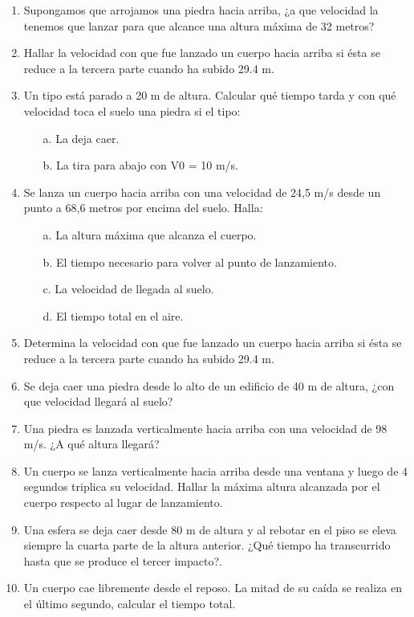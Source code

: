 \documentclass[a5paper,pagesize,10pt,bibtotoc,pointlessnumbers,
normalheadings,DIV=9,fleqn,x11names,table,twoside=false]{scrbook}
\begin{document}
\begin{enumerate}
 \item Supongamos que arrojamos una piedra hacia arriba, ¿a que velocidad la tenemos que lanzar para que alcance una altura máxima
de 32 metros?
\item Hallar la velocidad con que fue lanzado un cuerpo hacia arriba si ésta se reduce a la tercera parte cuando ha subido 29.4 m.
\item Un tipo está parado a 20 m de altura. Calcular qué tiempo tarda y con qué velocidad toca el suelo una piedra si el tipo:
\begin{itemize}
 \item[a.] La deja caer.
 \item[b.] La tira para abajo con V0 = 10 m/s.
\end{itemize}
\item Se lanza un cuerpo hacia arriba con una velocidad de 24,5 m/s desde un punto a 68,6 metros por encima del suelo. Halla:

\begin{itemize}
 \item[a.] La altura máxima que alcanza el cuerpo.
 \item[b.] El tiempo necesario para volver al punto de lanzamiento.
 \item[c.] La velocidad de llegada al suelo.
 \item[d.] El tiempo total en el aire.
\end{itemize}

\item Determina la velocidad con que fue lanzado un cuerpo hacia arriba si ésta se reduce a la tercera 
parte cuando ha subido 
29.4 m.

\item  Se deja caer una
 piedra desde lo alto de un edificio de 40 m de altura, ¿con que velocidad llegará al suelo?

\item  Una piedra es lanzada verticalmente
 hacia arriba con una velocidad de 98 m/s. ¿A qué altura llegará?

\item Un cuerpo se lanza verticalmente hacia arriba desde una ventana y luego de 4 segundos triplica su velocidad. Hallar la 
máxima altura alcanzada por el cuerpo respecto al lugar de lanzamiento.
\item Una esfera se deja caer desde 80 m de altura y al rebotar en el piso se eleva siempre la cuarta parte de la altura anterior. 
¿Qué tiempo ha transcurrido hasta que se produce el tercer impacto?.
\item Un cuerpo cae libremente desde el reposo. La mitad de su caída se realiza en el último segundo, calcular el tiempo total.


\end{enumerate}
\end{document}
